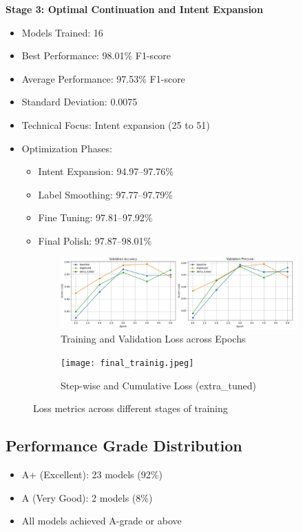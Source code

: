 \documentclass{ecai}
\begin{document}
\textbf{Stage 3: Optimal Continuation and Intent Expansion}
\begin{itemize}
    \item Models Trained: 16
    \item Best Performance: 98.01\% F1-score
    \item Average Performance: 97.53\% F1-score
    \item Standard Deviation: 0.0075
    \item Technical Focus: Intent expansion (25 to 51)
    \item Optimization Phases:
    \begin{itemize}
        \item Intent Expansion: 94.97–97.76\%
        \item Label Smoothing: 97.77–97.79\%
        \item Fine Tuning: 97.81–97.92\%
        \item Final Polish: 97.87–98.01\%
    \end{itemize}
\end{itemize}

\begin{figure}[H]
    \centering
    \begin{subfigure}{0.48\textwidth}
        \includegraphics[width=\linewidth]{training_matrices_3.jpeg}
        \caption{Training and Validation Loss across Epochs}
    \end{subfigure}
    \hfill
    \begin{subfigure}{0.48\textwidth}
        \texttt{[image: final\_trainig.jpeg]}
        \caption{Step-wise and Cumulative Loss (extra\_tuned)}
    \end{subfigure}
    \caption{Loss metrics across different stages of training}
    \label{fig:loss_metrics}
\end{figure}

\subsection{Performance Grade Distribution}
\begin{itemize}
    \item A+ (Excellent): 23 models (92\%)
    \item A (Very Good): 2 models (8\%)
    \item All models achieved A-grade or above
\end{itemize}
\end{document}
